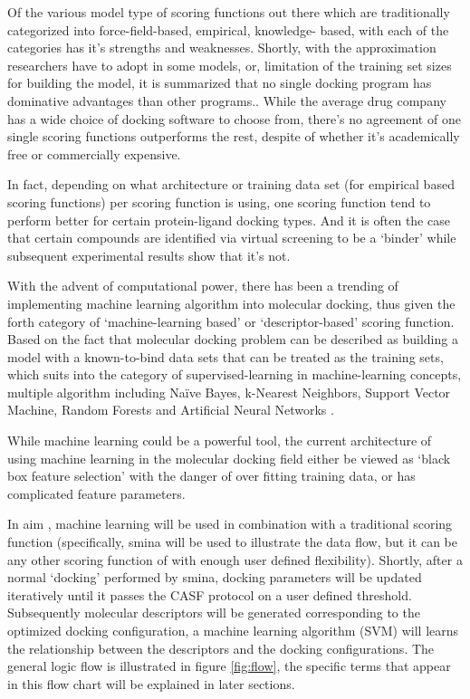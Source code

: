 Of the various model type of scoring functions out there which are traditionally categorized into force-field-based, empirical, knowledge- based, 
with each of the categories has it's strengths and weaknesses.
Shortly, with the approximation researchers have to adopt in some models, or, limitation of the training set sizes for building the model, 
it is summarized that no single docking program has dominative advantages than other programs.\cite{wang2016}.
While the average drug company has a wide choice of docking software to choose from, 
there's no agreement of one single scoring functions outperforms the rest, 
despite of whether it's academically free or commercially expensive.

In fact, depending on what architecture or training data set (for empirical based scoring functions) per scoring function is using, 
one scoring function tend to perform better for certain protein-ligand docking types.
And it is often the case that certain compounds are identified via virtual screening to be a `binder' while subsequent experimental results show that it's not.

With the advent of computational power, there has been a trending of implementing machine learning algorithm into molecular docking, thus given the forth category of `machine-learning based' or `descriptor-based' scoring function. 
Based on the fact that molecular docking problem can be described as building a model with a known-to-bind data sets that can be treated as the training sets, which suits into the category of supervised-learning in machine-learning concepts, multiple algorithm including Na\"{i}ve Bayes, k-Nearest Neighbors, Support Vector Machine, Random Forests and Artificial Neural Networks \cite{Carpenter2018}.

While machine learning could be a powerful tool, 
the current architecture of using machine learning in the molecular docking field either be viewed as `black box feature selection' \cite{Gabel2014} with the danger of over fitting training data, 
or has complicated feature parameters\cite{Lo2018}. 

In aim , machine learning will be used in combination with a traditional scoring function (specifically, smina will be used to illustrate the data flow, but it can be any other scoring function of with enough user defined flexibility).
Shortly, after a normal `docking' performed by smina, 
docking parameters will be updated iteratively until it passes the CASF protocol on a user defined threshold.
Subsequently molecular descriptors will be generated corresponding to the optimized docking configuration, 
a machine learning algorithm (SVM) will learns the relationship between the descriptors and the docking configurations. The general logic flow is illustrated in figure \ref{fig:flow}, the specific terms that appear in this flow chart will be explained in later sections.

